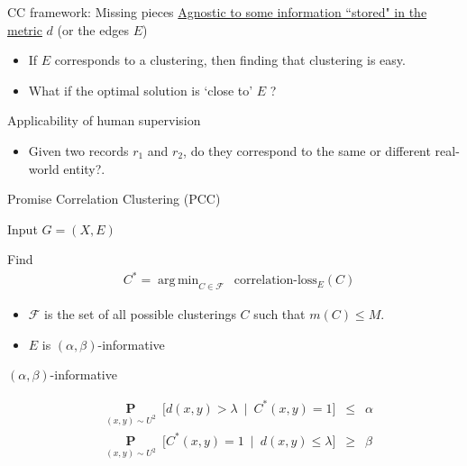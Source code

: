 \documentclass{beamer}
\newcommand{\mc}{\mathcal}
\newcommand{\mb}{\mathbf}
\DeclareMathOperator*{\argmin}{arg\,min}
\begin{document}
\begin{frame}[label=CCFramework]{CC framework: Missing pieces}
	\hyperlink{CCThoughts}{Agnostic to some information ``stored" in the metric} $d$ (or the edges $E$)
    \begin{itemize}
    	\vspace{10pt}\item If $E$ corresponds to a clustering, then finding that clustering is easy.\\
    	\vspace{10pt}\item What if the optimal solution is `close to' $E$ ? 
	\end{itemize}
	
	\vspace{20pt}Applicability of human supervision
	\begin{itemize}
    	\vspace{10pt}\item Given two records $r_1$ and $r_2$, do they correspond to the same or different real-world entity?.
	\end{itemize}
\end{frame}

\begin{frame}{Promise Correlation Clustering (PCC)}
	\begin{block}{Input}
		$G = (X, E)$
	\end{block}
	
	\begin{block}{Find}
	\vspace{-15pt}\begin{align*}
	  &C^* = \argmin_{C \in \mc F} \enspace \text{correlation-loss}_{E}(C) \label{eqn:promiseCorrLoss}
	\end{align*}
	
	\vspace{-10pt}\begin{itemize}
		\item $\mc F$ is the set of all possible clusterings $C$ such that $m(C) \le M$.
		\item $E$ is $(\alpha, \beta)$-informative
	\end{itemize}		
	\end{block}
	
	\begin{block}{$(\alpha, \beta)$-informative}
		
		\vspace{-10pt}\begin{align*}
			&\underset{(x, y) \sim U^2}{\mb P}\enspace \big[ d(x, y) > \lambda \enspace|\enspace C^*(x, y) = 1\big] \enspace \le \enspace \alpha \\
			&\underset{(x, y) \sim U^2}{\mb P}\enspace \big[C^*(x, y) = 1 \enspace|\enspace d(x, y) \le \lambda \big] \enspace \ge \enspace \beta 
		\end{align*}
	\end{block}	
\end{frame}
\end{document}

